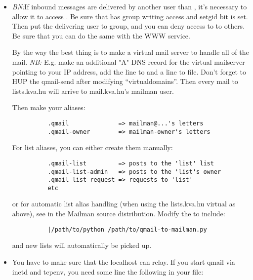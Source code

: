 \documentclass{howto}
\begin{document}
\begin{itemize}
\item \emph{BN:}If inbound messages are delivered by another user than
      , it's necessary to allow it to access .
      Be sure that  has group writing access and setgid bit is
      set.  Then put the delivering user to  group, and you can
      deny access to  to others.  Be sure that you can do the
      same with the WWW service.

      By the way the best thing is to make a virtual mail server to handle all
      of the mail.  \emph{NB:} E.g. make an additional "A" DNS record for the
      virtual mailserver pointing to your IP address, add the line
       to 
      and a  line to 
      file.  Don't forget to HUP the qmail-send after modifying
      ``virtualdomains''.  Then every mail to lists.kva.hu will arrive to
      mail.kva.hu's mailman user.

      Then make your aliases:

\begin{verbatim}
          .qmail              => mailman@...'s letters
          .qmail-owner        => mailman-owner's letters
\end{verbatim}

      For list aliases, you can either create them manually:

\begin{verbatim}
          .qmail-list         => posts to the 'list' list
          .qmail-list-admin   => posts to the 'list's owner
          .qmail-list-request => requests to 'list'
          etc
\end{verbatim}

      or for automatic list alias handling (when using the lists.kva.hu
      virtual as above), see  in the Mailman
      source distribution.  Modify the  to
      include:

\begin{verbatim}
          |/path/to/python /path/to/qmail-to-mailman.py
\end{verbatim}

      and new lists will automatically be picked up.

\item You have to make sure that the localhost can relay.  If you start qmail
      via inetd and tcpenv, you need some line the following in your
       file:


\end{itemize}
\end{document}
